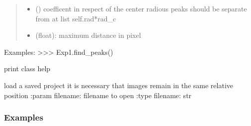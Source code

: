 \documentclass[letterpaper,10pt,english]{sphinxmanual}
\begin{document}
\begin{fulllineitems}
\begin{fulllineitems}
\begin{quote}
\begin{description}
\begin{itemize}
\item {} 
 () \textendash{} coefficent in respect of the center radious peaks should be separate from at list self.rad*rad\_c

\item {} 
 \textendash{} (float): maximum distance in pixel

\end{itemize}

\end{description}\end{quote}

Examples:
\textgreater{}\textgreater{}\textgreater{} Exp1.find\_peaks()

\end{fulllineitems}


\begin{fulllineitems}
\label{\detokenize{index:TEMpcPlot.SeqIm.help}}
print class help

\end{fulllineitems}


\begin{fulllineitems}
\label{\detokenize{index:TEMpcPlot.SeqIm.load}}
load a saved project
it is necessary that images remain in the same relative
position
:param filename: filename to open
:type filename: str
\subsubsection*{Examples}

\begin{sphinxVerbatim}[commandchars=\\\{\}]
  
\end{sphinxVerbatim}

\end{fulllineitems}


\end{fulllineitems}
\end{document}
